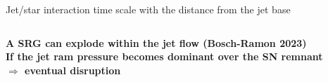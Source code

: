 \begin{frame}{Jet/star interaction time scale with the distance from the jet base}
\begin{columns}
{\begin{column}{0.5\textwidth}
			\bf{A SRG can explode within the jet flow (Bosch-Ramon 2023) \\
		If the jet ram pressure becomes dominant over the SN remnant \\
						$\Rightarrow$ eventual disruption	}

		\end{column}}	
	\end{columns}
\end{frame}
